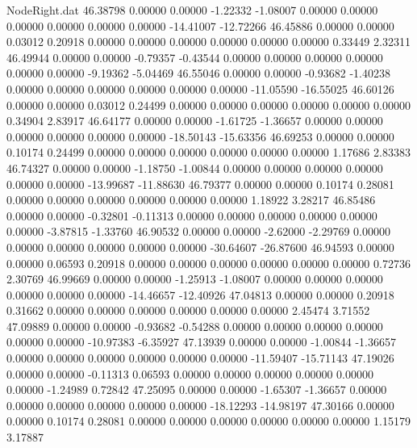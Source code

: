 \begin{filecontents}{NodeRight.dat}
  46.38798    0.00000    0.00000    -1.22332   -1.08007    0.00000    0.00000    0.00000    0.00000    0.00000    0.00000  -14.41007  -12.72266
  46.45886    0.00000    0.00000     0.03012    0.20918    0.00000    0.00000    0.00000    0.00000    0.00000    0.00000    0.33449    2.32311
  46.49944    0.00000    0.00000    -0.79357   -0.43544    0.00000    0.00000    0.00000    0.00000    0.00000    0.00000   -9.19362   -5.04469
  46.55046    0.00000    0.00000    -0.93682   -1.40238    0.00000    0.00000    0.00000    0.00000    0.00000    0.00000  -11.05590  -16.55025
  46.60126    0.00000    0.00000     0.03012    0.24499    0.00000    0.00000    0.00000    0.00000    0.00000    0.00000    0.34904    2.83917
  46.64177    0.00000    0.00000    -1.61725   -1.36657    0.00000    0.00000    0.00000    0.00000    0.00000    0.00000  -18.50143  -15.63356
  46.69253    0.00000    0.00000     0.10174    0.24499    0.00000    0.00000    0.00000    0.00000    0.00000    0.00000    1.17686    2.83383
  46.74327    0.00000    0.00000    -1.18750   -1.00844    0.00000    0.00000    0.00000    0.00000    0.00000    0.00000  -13.99687  -11.88630
  46.79377    0.00000    0.00000     0.10174    0.28081    0.00000    0.00000    0.00000    0.00000    0.00000    0.00000    1.18922    3.28217
  46.85486    0.00000    0.00000    -0.32801   -0.11313    0.00000    0.00000    0.00000    0.00000    0.00000    0.00000   -3.87815   -1.33760
  46.90532    0.00000    0.00000    -2.62000   -2.29769    0.00000    0.00000    0.00000    0.00000    0.00000    0.00000  -30.64607  -26.87600
  46.94593    0.00000    0.00000     0.06593    0.20918    0.00000    0.00000    0.00000    0.00000    0.00000    0.00000    0.72736    2.30769
  46.99669    0.00000    0.00000    -1.25913   -1.08007    0.00000    0.00000    0.00000    0.00000    0.00000    0.00000  -14.46657  -12.40926
  47.04813    0.00000    0.00000     0.20918    0.31662    0.00000    0.00000    0.00000    0.00000    0.00000    0.00000    2.45474    3.71552
  47.09889    0.00000    0.00000    -0.93682   -0.54288    0.00000    0.00000    0.00000    0.00000    0.00000    0.00000  -10.97383   -6.35927
  47.13939    0.00000    0.00000    -1.00844   -1.36657    0.00000    0.00000    0.00000    0.00000    0.00000    0.00000  -11.59407  -15.71143
  47.19026    0.00000    0.00000    -0.11313    0.06593    0.00000    0.00000    0.00000    0.00000    0.00000    0.00000   -1.24989    0.72842
  47.25095    0.00000    0.00000    -1.65307   -1.36657    0.00000    0.00000    0.00000    0.00000    0.00000    0.00000  -18.12293  -14.98197
  47.30166    0.00000    0.00000     0.10174    0.28081    0.00000    0.00000    0.00000    0.00000    0.00000    0.00000    1.15179    3.17887

\end{filecontents}
